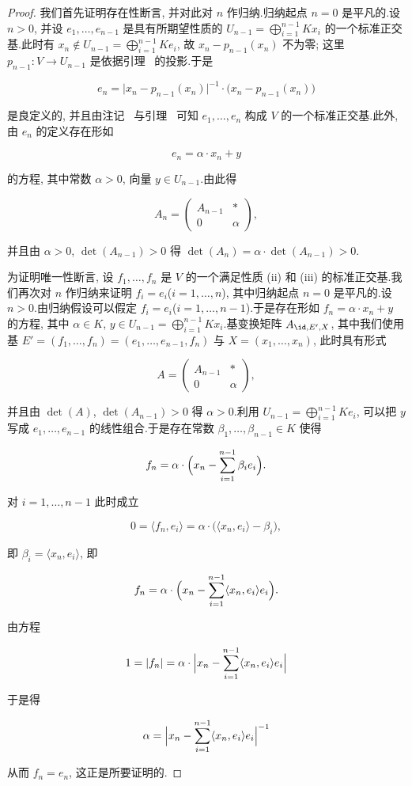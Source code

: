 \begin{proof}
我们首先证明存在性断言, 并对此对 $n$ 作归纳.归纳起点 $n = 0$ 是平凡的.设 $n > 0$, 并设 $e_1, \ldots, e_{n-1}$ 是具有所期望性质的 $U_{n-1} = \bigoplus_{i = 1}^{n-1} K x_i$ 的一个标准正交基.此时有 $x_n \notin U_{n-1} = \bigoplus_{i = 1}^{n-1} K e_i$, 故 $x_n - p_{n-1}(x_n)$ 不为零; 这里 $p_{n-1} \colon V \longrightarrow U_{n-1}$ 是依据引理~ 的投影.于是

\[
e_n = \bigl|x_n - p_{n-1}(x_n)\bigr|^{-1} \cdot \bigl(x_n - p_{n-1}(x_n)\bigr)
\]

是良定义的, 并且由注记~ 与引理~ 可知 $e_1, \ldots, e_n$ 构成 $V$ 的一个标准正交基.此外, 由 $e_n$ 的定义存在形如

\[
e_n = \alpha \cdot x_n + y
\]

的方程, 其中常数 $\alpha > 0$, 向量 $y \in U_{n-1}$.由此得

\[
A_n = \begin{pmatrix} A_{n-1} & * \\ 0 & \alpha \end{pmatrix},
\]

并且由 $\alpha > 0$, $\det(A_{n-1}) > 0$ 得 $\det(A_n) = \alpha \cdot \det(A_{n-1}) > 0$.

为证明唯一性断言, 设 $f_1, \ldots, f_n$ 是 $V$ 的一个满足性质 (ii) 和 (iii) 的标准正交基.我们再次对 $n$ 作归纳来证明 $f_i = e_i$($i = 1, \ldots, n$), 其中归纳起点 $n = 0$ 是平凡的.设 $n > 0$.由归纳假设可以假定 $f_i = e_i$($i = 1, \ldots, n-1$).于是存在形如 $f_n = \alpha \cdot x_n + y$ 的方程, 其中 $\alpha \in K$, $y \in U_{n-1} = \bigoplus_{i = 1}^{n-1} K x_i$.基变换矩阵 $A_{\id, E', X}$, 其中我们使用基 $E' = (f_1, \ldots, f_n) = (e_1, \ldots, e_{n-1}, f_n)$ 与 $X = (x_1, \ldots, x_n)$, 此时具有形式

\[
A = \begin{pmatrix} A_{n-1} & * \\ 0 & \alpha \end{pmatrix},
\]

并且由 $\det(A)$, $\det(A_{n-1}) > 0$ 得 $\alpha > 0$.利用 $U_{n-1} = \bigoplus_{i = 1}^{n-1} K e_i$, 可以把 $y$ 写成 $e_1, \ldots, e_{n-1}$ 的线性组合.于是存在常数 $\beta_1, \ldots, \beta_{n-1} \in K$ 使得

\[
f_n = \alpha \cdot \Bigl(x_n - \sum_{i = 1}^{n-1} \beta_i e_i\Bigr)\text{.}
\]

对 $i = 1, \ldots, n-1$ 此时成立

\[
0 = \langle f_n, e_i \rangle = \alpha \cdot \bigl(\langle x_n, e_i \rangle - \beta_i\bigr),
\]

即 $\beta_i = \langle x_n, e_i \rangle$, 即

\[
f_n = \alpha \cdot \Bigl(x_n - \sum_{i = 1}^{n-1} \langle x_n, e_i \rangle e_i\Bigr)\text{.}
\]

由方程

\[
1 = |f_n| = \alpha \cdot \Bigl|x_n - \sum_{i = 1}^{n-1} \langle x_n, e_i \rangle e_i\Bigr|
\]

于是得

\[
\alpha = \Bigl|x_n - \sum_{i = 1}^{n-1} \langle x_n, e_i \rangle e_i\Bigr|^{-1}
\]

从而 $f_n = e_n$, 这正是所要证明的.
\end{proof}

